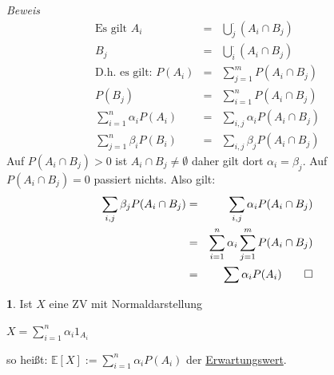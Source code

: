 \documentclass[10pt,a4paper]{report}
\numberwithin{equation}{section}
\numberwithin{figure}{section}
\theoremstyle{plain}
\theoremstyle{definition}
\newtheorem{defn}{\protect\definitionname}[section]
\theoremstyle{plain}
\theoremstyle{definition}
\theoremstyle{remark}
\theoremstyle{plain}
\theoremstyle{plain}
\theoremstyle{plain}
\theoremstyle{plain}
\theoremstyle{plain}
\providecommand{\definitionname}{Definition}
\newcommand{\1}{ \mathbb{1} } %
\begin{document}
\textit{Beweis}
\begin{eqnarray*}
\text{Es gilt } A_i&=&\bigcup_j^\cdot (A_i\cap B_j)\\
B_j&=&\bigcup_i^\cdot (A_i\cap B_j)\\
\text{D.h. es gilt: } P(A_i)&=&\sum\limits_{j=1}^mP(A_i\cap B_j)\\
P(B_j)&=&\sum\limits_{i=1}^nP(A_i\cap B_j)\\
\sum\limits_{i=1}^n\alpha_iP(A_i)&=&\sum\limits_{i,j}\alpha_iP(A_i\cap B_j)\\
\sum\limits_{j=1}^n\beta_iP(B_i)&=&\sum\limits_{i,j}\beta_jP(A_i\cap B_j)
\end{eqnarray*}
Auf $P(A_i\cap B_j)>0$ ist $A_i\cap B_j \neq \emptyset$ daher gilt dort $\alpha_i=\beta_j$. Auf $P(A_i\cap B_j)=0$ passiert nichts. Also gilt:
\begin{eqnarray*}
\sum\limits_{i,j}\beta_jP(A_i\cap B_j)&=&\sum\limits_{i,j}\alpha_iP(A_i\cap B_j)\\
&=&\sum\limits_{i=1}^n\alpha_i\sum\limits_{j=1}^mP(A_i\cap B_j)\\
&=&\sum\limits \alpha_i P(A_i)\qed
\end{eqnarray*}
\begin{defn}
  Ist $X$ eine ZV mit Normaldarstellung
  \begin{center}
    $X=\sum\limits_{i=1}^n\alpha_i1_{A_i}$
  \end{center}
  so heißt: $\mathbb{E}[X]:=\sum\limits_{i=1}^n\alpha_iP(A_i)$ der \underline{Erwartungswert}.\\\\
\end{defn}
\end{document}
